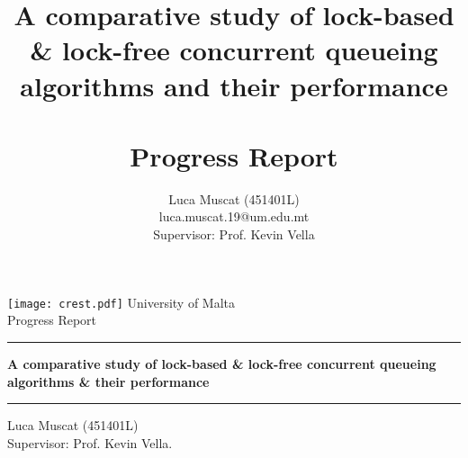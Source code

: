 \documentclass[a4paper, 12pt, titlepage]{article}
\begin{document}
\begin{titlepage}
    \centering
    \texttt{[image: crest.pdf]} %
    \vskip1cm
    {\large University of Malta \\ Progress Report}

    \vfill
    \rule{\textwidth}{0.4pt}
    {\Large\textbf{A comparative study of lock-based \& lock-free concurrent queueing algorithms \& their performance}\\
    \rule{\textwidth}{0.4pt}
        \vskip2cm
        Luca Muscat (451401L) \\ Supervisor: Prof. Kevin Vella.
    }
    
    \vfill
    \vfill
    \vfill
\end{titlepage}

\title{A comparative study of lock-based \& lock-free concurrent queueing algorithms and their performance \\ \\ \large Progress Report}
\author{Luca Muscat (451401L) \\ luca.muscat.19@um.edu.mt \\ Supervisor: Prof. Kevin Vella}

\pagebreak
{}
\tableofcontents
\pagebreak
{}



\end{document}
